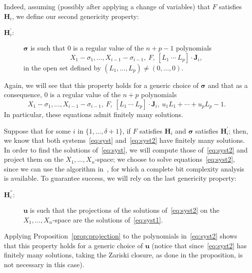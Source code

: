 \documentclass[12pt]{article}
\def\xb{{\bm x}}
\def\C{\mathbb{C}}
\begin{document}
Indeed, assuming (possibly after applying a change of variables) that
$F$ satisfies $\bm H_i$, we define our second genericity property:
\begin{description}
\item [$\bm H^{'}_i:$] $\bm \sigma$ is such that $0$ is a regular value of the $n+p-1$
  polynomials
  \[ X_1 - \sigma_1, \dots, X_{i-1} - \sigma_{i-1},\ F,\ [L_1~\cdots~L_p]\cdot \bm J_i, \]
  in the open set defined by $(L_1,\dots,L_p) \ne (0,\dots,0)$.
\end{description}
Again, we will see that this property holds for a generic choice of
$\bm\sigma$ and that as a consequence, $0$ is a regular value of the
$n+p$ polynomials
\begin{equation}\label{eq:syst2}
  X_1 - \sigma_1, \dots, X_{i-1} - \sigma_{i-1},\ F,\ [L_1~\cdots~L_p]\cdot \bm J_i,\ u_1 L_1 + \cdots + u_p L_p -1.
\end{equation}
In particular, these equations admit finitely many solutions.

Suppose that for some $i$ in $\{1,\dots,\delta+1\}$, if $F$ satisfies
$\bm H_i$ and $\bm \sigma$ satisfies $\bm H_i^{'}$; then, we know that
both systems~\eqref{eq:syst} and~\eqref{eq:syst2} have finitely many
solutions. In order to find the solutions of~\eqref{eq:syst}, we will
compute those of~\eqref{eq:syst2} and project them on the
$X_1,\dots,X_n$-space; we choose to solve equations~\eqref{eq:syst2},
since we can use the algorithm in~\cite{SH}, for which a complete bit
complexity analysis is available. To guarantee success, we will rely
on the last genericity property:
\begin{description}
\item [$\bm H^{''}_i:$] $\bm u$ is such that the projections of the
  solutions of~\eqref{eq:syst2} on the $X_1,\dots,X_n$-space are the
  solutions of~\eqref{eq:syst1}.
\end{description}
Applying Proposition~\ref{prop:projection} to the polynomials
in~\eqref{eq:syst2} shows that this property holds for a generic
choice of $\bm u$ (notice that since~\eqref{eq:syst2} has finitely
many solutions, taking the Zariski closure, as done in the
proposition, is not necessary in this case).
\end{document}
